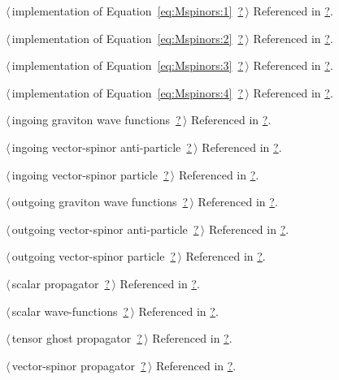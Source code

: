 \documentclass[a4paper,12pt]{amsart}
\renewcommand{\NWlink}[2]{\hyperlink{#1}{#2}}
\renewcommand{\NWtxtRefIn}{Referenced in}
\begin{document}
{\begin{list}{}{\setlength{\itemsep}{-\parsep}\setlength{\itemindent}{-\leftmargin}}
\item $\langle\,$implementation of Equation~\eqref{eq:Mspinors:1}\nobreak\ {\footnotesize \NWlink{nuweb?}{?}}$\,\rangle$ {\footnotesize {\NWtxtRefIn} \NWlink{nuweb?}{?}.}
\item $\langle\,$implementation of Equation~\eqref{eq:Mspinors:2}\nobreak\ {\footnotesize \NWlink{nuweb?}{?}}$\,\rangle$ {\footnotesize {\NWtxtRefIn} \NWlink{nuweb?}{?}.}
\item $\langle\,$implementation of Equation~\eqref{eq:Mspinors:3}\nobreak\ {\footnotesize \NWlink{nuweb?}{?}}$\,\rangle$ {\footnotesize {\NWtxtRefIn} \NWlink{nuweb?}{?}.}
\item $\langle\,$implementation of Equation~\eqref{eq:Mspinors:4}\nobreak\ {\footnotesize \NWlink{nuweb?}{?}}$\,\rangle$ {\footnotesize {\NWtxtRefIn} \NWlink{nuweb?}{?}.}
\item $\langle\,$ingoing graviton wave functions\nobreak\ {\footnotesize \NWlink{nuweb?}{?}}$\,\rangle$ {\footnotesize {\NWtxtRefIn} \NWlink{nuweb?}{?}.}
\item $\langle\,$ingoing vector-spinor anti-particle\nobreak\ {\footnotesize \NWlink{nuweb?}{?}}$\,\rangle$ {\footnotesize {\NWtxtRefIn} \NWlink{nuweb?}{?}.}
\item $\langle\,$ingoing vector-spinor particle\nobreak\ {\footnotesize \NWlink{nuweb?}{?}}$\,\rangle$ {\footnotesize {\NWtxtRefIn} \NWlink{nuweb?}{?}.}
\item $\langle\,$outgoing graviton wave functions\nobreak\ {\footnotesize \NWlink{nuweb?}{?}}$\,\rangle$ {\footnotesize {\NWtxtRefIn} \NWlink{nuweb?}{?}.}
\item $\langle\,$outgoing vector-spinor anti-particle\nobreak\ {\footnotesize \NWlink{nuweb?}{?}}$\,\rangle$ {\footnotesize {\NWtxtRefIn} \NWlink{nuweb?}{?}.}
\item $\langle\,$outgoing vector-spinor particle\nobreak\ {\footnotesize \NWlink{nuweb?}{?}}$\,\rangle$ {\footnotesize {\NWtxtRefIn} \NWlink{nuweb?}{?}.}
\item $\langle\,$scalar propagator\nobreak\ {\footnotesize \NWlink{nuweb?}{?}}$\,\rangle$ {\footnotesize {\NWtxtRefIn} \NWlink{nuweb?}{?}.}
\item $\langle\,$scalar wave-functions\nobreak\ {\footnotesize \NWlink{nuweb?}{?}}$\,\rangle$ {\footnotesize {\NWtxtRefIn} \NWlink{nuweb?}{?}.}
\item $\langle\,$tensor ghost propagator\nobreak\ {\footnotesize \NWlink{nuweb?}{?}}$\,\rangle$ {\footnotesize {\NWtxtRefIn} \NWlink{nuweb?}{?}.}
\item $\langle\,$vector-spinor propagator\nobreak\ {\footnotesize \NWlink{nuweb?}{?}}$\,\rangle$ {\footnotesize {\NWtxtRefIn} \NWlink{nuweb?}{?}.}

\end{list}}
\end{document}
